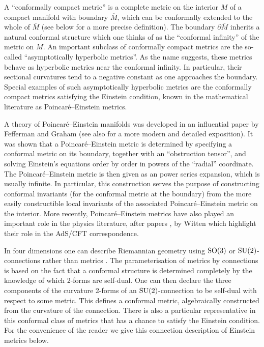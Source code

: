 \documentclass[a4paper,12pt]{article}
\newcommand{\Mb}{\overline{M}}
\begin{document}
A ``conformally compact metric'' is a complete metric on the interior $M$ of a compact manifold with boundary $\Mb$, which can be conformally extended to the whole of $\Mb$ (see below for a more precise definition). The boundary $\partial \Mb$ inherits a natural conformal structure which one thinks of as the ``conformal infinity'' of the metric on $M$. 
An important subclass of conformally compact metrics are the so-called ``asymptotically hyperbolic metrics''. As the name suggests, these metrics behave as hyperbolic metrics near the conformal infinity. In particular, their sectional curvatures tend to a negative constant as one approaches the boundary. Special examples of such asymptotically hyperbolic metrics are the conformally compact metrics satisfying the Einstein condition, known in the mathematical literature as Poincar\'e--Einstein metrics.

A theory of Poincar\'e--Einstein manifolds was developed in an influential paper \cite{FG} by Fefferman and Graham (see also \cite{Fefferman:2007rka} for a more modern and detailed exposition). It was shown that a Poincar\'e--Einstein metric is determined by specifying a conformal metric on its boundary, together with an ``obstruction tensor'', and solving Einstein's equations order by order in powers of the ``radial'' coordinate. The Poincar\'e--Einstein metric is then given as an power series expansion, which is usually infinite. In particular, this construction serves the purpose of constructing conformal invariants (for the conformal metric at the boundary) from the more easily constructible local invariants of the associated Poincar\'e--Einstein metric on the interior. More recently, Poincar\'e--Einstein metrics have also played an important role in the physics literature, after papers \cite{Witten:1998qj}, \cite{Witten:1998zw} by Witten which highlight their role in the AdS/CFT correspondence. 

In four dimensions one can describe Riemannian geometry using ${\rm SO}(3)$ or ${\rm SU}(2)$-connections rather than metrics \cite{Fine:2013qta}. The parameterisation of metrics by connections is based on the fact that  a conformal structure is determined completely by the knowledge of which 2-forms are self-dual. One can then declare the three components of the curvature 2-forms of an ${\rm SU}(2)$-connection to be self-dual with respect to some metric. This defines a conformal metric, algebraically constructed from the curvature of the connection. There is also a particular representative in this conformal class of metrics that has a chance to satisfy the Einstein condition. For the convenience of the reader we give this connection description of Einstein metrics below.
\end{document}
